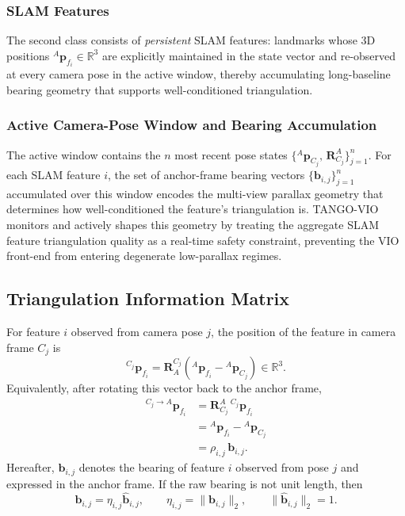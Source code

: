 \documentclass[journal]{IEEEtran}
\newcommand{\R}{\mathbb{R}}
\begin{document}
\subsubsection*{SLAM Features}
The second class consists of \emph{persistent} SLAM features: landmarks whose 3D positions ${}^{A}\bm{p}_{f_i}\in\R^{3}$ are explicitly maintained in the state vector and re-observed at every camera pose in the active window, thereby accumulating long-baseline bearing geometry that supports well-conditioned triangulation.

\subsubsection*{Active Camera-Pose Window and Bearing Accumulation}
The active window contains the $n$ most recent pose states $\{{}^{A}\bm{p}_{C_j},\,\bm{R}_{C_j}^{A}\}_{j=1}^{n}$. For each SLAM feature $i$, the set of anchor-frame bearing vectors $\{\bm{b}_{i,j}\}_{j=1}^{n}$ accumulated over this window encodes the multi-view parallax geometry that determines how well-conditioned the feature's triangulation is. TANGO-VIO monitors and actively shapes this geometry by treating the aggregate SLAM feature triangulation quality as a real-time safety constraint, preventing the VIO front-end from entering degenerate low-parallax regimes.


\subsection{Triangulation Information Matrix}
\label{triangulationInformationMatrix}

For feature $i$ observed from camera pose $j$, the position of the feature in
camera frame $C_j$ is
\begin{equation}
  {}^{C_j}\bm{p}_{f_i}
  = \bm{R}_{A}^{C_j}\left({}^{A}\bm{p}_{f_i}
  - {}^{A}\bm{p}_{C_j}\right)
  \in\R^3 .
  \label{eq:feature_camera_frame}
\end{equation}
Equivalently, after rotating this vector back to the anchor frame,
\begin{equation}
    \begin{split}
  {}^{C_j\to A}\bm{p}_{f_i}
  &= \bm{R}_{C_j}^{A}\,{}^{C_j}\bm{p}_{f_i} \\
  &= {}^{A}\bm{p}_{f_i}-{}^{A}\bm{p}_{C_j} \\
  &= \rho_{i,j}\,\bm{b}_{i,j}.
  \label{eq:feature_anchor_factored}
      \end{split}
\end{equation}
Hereafter, $\bm{b}_{i,j}$ denotes the bearing of feature $i$ observed from pose
$j$ and expressed in the anchor frame.  If the raw bearing is not unit length,
then
\begin{equation}
  \bm{b}_{i,j}=\eta_{i,j}\hat{\bm{b}}_{i,j},
  \qquad
  \eta_{i,j}=\|\bm{b}_{i,j}\|_2,
  \qquad
  \|\hat{\bm{b}}_{i,j}\|_2=1 .
\end{equation}
\end{document}
